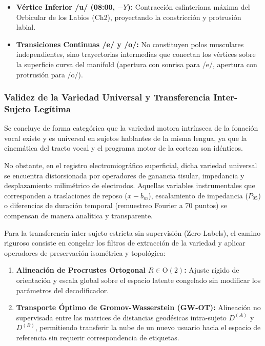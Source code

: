 \documentclass[11pt,a4paper]{article}
\begin{document}
\begin{enumerate}
\begin{itemize}
        \item \textbf{Vértice Inferior /u/ (08:00, $-Y$):} Contracción esfinteriana máxima del Orbicular de los Labios (Ch2), proyectando la constricción y protrusión labial.
        \item \textbf{Transiciones Continuas /e/ y /o/:} No constituyen polos musculares independientes, sino trayectorias intermedias que conectan los vértices sobre la superficie curva del manifold (apertura con sonrisa para /e/, apertura con protrusión para /o/).
    \end{itemize}
\end{enumerate}

\subsubsection{Validez de la Variedad Universal y Transferencia Inter-Sujeto Legítima}
\label{subsubsec:validez_transferencia_universal}

Se concluye de forma categórica que la variedad motora intrínseca de la fonación vocal existe y es universal en sujetos hablantes de la misma lengua, ya que la cinemática del tracto vocal y el programa motor de la corteza son idénticos. 

No obstante, en el registro electromiográfico superficial, dicha variedad universal se encuentra distorsionada por operadores de ganancia tisular, impedancia y desplazamiento milimétrico de electrodos. Aquellas variables instrumentales que corresponden a traslaciones de reposo ($x - b_m$), escalamiento de impedancia ($P_{95}$) o diferencias de duración temporal (remuestreo Fourier a 70 puntos) se compensan de manera analítica y transparente.

Para la transferencia inter-sujeto estricta sin supervisión (Zero-Labels), el camino riguroso consiste en congelar los filtros de extracción de la variedad y aplicar operadores de preservación isométrica y topológica:
\begin{enumerate}
    \item \textbf{Alineación de Procrustes Ortogonal $R \in \text{O}(2)$:} Ajuste rígido de orientación y escala global sobre el espacio latente congelado sin modificar los parámetros del decodificador.
    \item \textbf{Transporte Óptimo de Gromov-Wasserstein (GW-OT):} Alineación no supervisada entre las matrices de distancias geodésicas intra-sujeto $D^{(A)}$ y $D^{(B)}$, permitiendo transferir la nube de un nuevo usuario hacia el espacio de referencia sin requerir correspondencia de etiquetas.
\end{enumerate}
\end{document}
